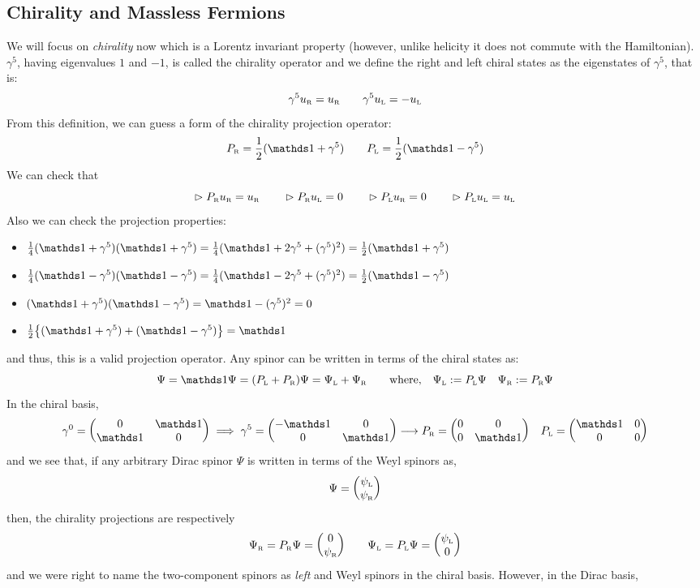 \subsection{ Chirality and Massless Fermions}
We will focus on \textit{chirality} now which is a Lorentz invariant property (however, unlike helicity it does not commute with the Hamiltonian). $\gamma^5$, having eigenvalues $1$ and $-1$, is called the chirality operator and we define the right and left chiral states as the eigenstates of $\gamma^5$, that is:
$$\gamma^5 u_{\text{\tiny R}}=u_{\text{\tiny R}} \qquad \gamma^5 u_{\text{\tiny L}}=-u_{\text{\tiny L}}$$
From this definition, we can guess a form of the chirality projection operator:
$$P_{\text{\tiny R}} = \frac{1}{2}(\iden+\gamma^5)\qquad P_{\text{\tiny L}} = \frac{1}{2}(\iden-\gamma^5)$$
We can check that $$\vartriangleright P_{\text{\tiny R}}u_{\text{\tiny R}} = u_{\text{\tiny R}}\qquad \vartriangleright P_{\text{\tiny R}}u_{\text{\tiny L}} = 0\qquad \vartriangleright P_{\text{\tiny L}}u_{\text{\tiny R}} = 0\qquad \vartriangleright P_{\text{\tiny L}}u_{\text{\tiny L}} = u_{\text{\tiny L}}$$
Also we can check the projection properties:
\begin{itemize}
    \item $\frac{1}{4}(\iden+\gamma^5)(\iden+\gamma^5) = \frac{1}{4}(\iden+2\gamma^5 + (\gamma^5)^2) = \frac{1}{2}(\iden + \gamma^5)$
  \item $\frac{1}{4}(\iden-\gamma^5)(\iden-\gamma^5) = \frac{1}{4}(\iden-2\gamma^5 + (\gamma^5)^2) = \frac{1}{2}(\iden - \gamma^5)$
   \item $(\iden+\gamma^5)(\iden-\gamma^5) = \iden - (\gamma^5)^2 = 0$
    \item $\frac{1}{2}\qty{(\iden+\gamma^5) + (\iden-\gamma^5)} = \iden$
\end{itemize}
and thus, this is a valid projection operator. Any spinor can be written in terms of the chiral states as:
$$\Psi = \iden \Psi = (P_{\text{\tiny L}} + P_{\text{\tiny R}})\Psi = \Psi_{\text{\tiny L}} + \Psi_{\text{\tiny R}}\qquad \text{where,}\quad  \Psi_{\text{\tiny L}} := P_{\text{\tiny L}}\Psi \quad \Psi_{\text{\tiny R}} := P_{\text{\tiny R}}\Psi$$
In the chiral basis, $$\gamma^0 = \mqty(0 & \iden \\ \iden & 0) \implies \gamma^5 = \mqty( - \iden & 0 \\ 0 &\iden)\longrightarrow P_{\text{\tiny R}} = \mqty(0&0\\ 0& \iden) \quad   P_{\text{\tiny L}} = \mqty(\iden&0\\ 0& 0)$$
and we see that, if any arbitrary Dirac spinor $\Psi$ is written in terms of the Weyl spinors as,
$$\Psi = \mqty(\psi_{\text{\tiny L}}\\\psi_{\text{\tiny R}})$$ 
then, the chirality projections are respectively $$\Psi_{\text{\tiny R}} = P_{\text{\tiny R}}\Psi = \mqty(0\\ \psi_{\text{\tiny R}})\qquad \Psi_{\text{\tiny L}} =P_{\text{\tiny L}}\Psi = \mqty(\psi_{\text{\tiny L}}\\0)$$
and we were right to name the two-component spinors as \textit{left} and  Weyl spinors in the chiral basis. However, in the Dirac basis, 

